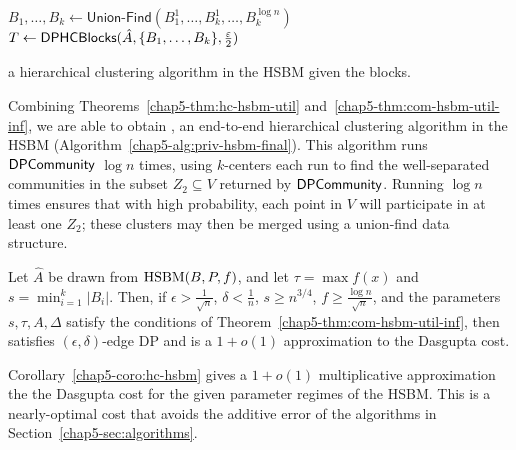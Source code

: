 \begin{algorithm}
$B_1, \ldots, B_k \gets \textsf{Union-Find}(B_1^1, \ldots, B_k^1, \ldots, B_k^{\log n})$\;
$T \gets \textsf{DPHCBlocks}{}(\hat{A}, \{B_1, \ldots, B_k\}, \frac{\varepsilon}{2})$\;
\caption{\dphchsbm{} a hierarchical clustering algorithm in the HSBM given the blocks.}\label{chap5-alg:priv-hsbm-final}
\end{algorithm}

Combining Theorems~\ref{chap5-thm:hc-hsbm-util} and~\ref{chap5-thm:com-hsbm-util-inf}, we are able to obtain \dphchsbm{}, an end-to-end hierarchical clustering algorithm in the HSBM (Algorithm~\ref{chap5-alg:priv-hsbm-final}). This algorithm runs $\textsf{DPCommunity}{}$ $\log n$ times, using $k$-centers each run to find the well-separated communities in the subset $Z_2 \subseteq V$ returned by $\textsf{DPCommunity}{}$. Running $\log n$ times ensures that with high probability, each point in $V$ will participate in at least one $Z_2$; these clusters may then be merged using a union-find data structure.
\begin{coro}\label{chap5-coro:hc-hsbm}
    Let $\hat{A}$ be drawn from $\textnormal{HSBM}(B,P,f)$, and let $\tau = \max f(x)$ and $s = \min_{i=1}^k|B_i|$. Then, if $\epsilon > \frac{1}{\sqrt{n}}$, $\delta < \frac{1}{n}$, $s \geq n^{3/4}$, $f \geq \frac{\log n}{\sqrt{n}}$, and the parameters $s,\tau,A,\Delta$ satisfy the conditions of Theorem~\ref{chap5-thm:com-hsbm-util-inf}, then \dphchsbm{} satisfies $(\epsilon, \delta)$-edge DP and is a $1+o(1)$ approximation to the Dasgupta cost. 
\end{coro}
Corollary~\ref{chap5-coro:hc-hsbm} gives a $1+o(1)$ multiplicative approximation the the Dasgupta cost for the given parameter regimes of the HSBM. This is a nearly-optimal cost that avoids the additive error of the algorithms in Section~\ref{chap5-sec:algorithms}.
